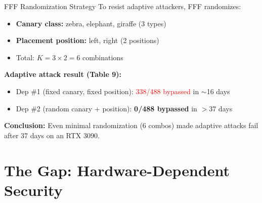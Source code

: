 \documentclass[aspectratio=169,11pt]{beamer}
\begin{document}
\begin{frame}{FFF Randomization Strategy}
To resist adaptive attackers, FFF randomizes:
\begin{itemize}
    \item \textbf{Canary class:} zebra, elephant, giraffe (3 types)
    \item \textbf{Placement position:} left, right (2 positions)
    \item Total: $K = 3 \times 2 = 6$ combinations
\end{itemize}

\vspace{0.3cm}
\textbf{Adaptive attack result (Table 9):}
\begin{itemize}
    \item Dep \#1 (fixed canary, fixed position): \textcolor{red}{338/488 bypassed} in $\sim$16 days
    \item Dep \#2 (random canary + position): \textcolor{green!60!black}{\textbf{0/488 bypassed}} in $>$37 days
\end{itemize}

\vspace{0.3cm}
\textbf{Conclusion:} Even minimal randomization (6 combos) made adaptive attacks fail after 37 days on an RTX 3090.
\end{frame}

\section{The Gap: Hardware-Dependent Security}
\end{document}
